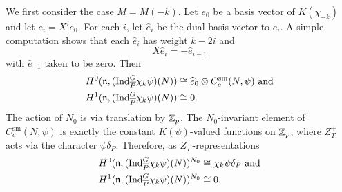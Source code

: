 \documentclass[10pt]{amsart}
\begin{document}
\begin{example}\label{ex:Jacquet_indchi} We first consider the case $M=M(-k)$. Let $e_{0}$ be a basis vector of $K(\chi_{-k})$ and let $e_{i}=X^{i}e_{0}$. For each $i$, let $\widehat{e}_{i}$ be the dual basis vector to $e_{i}$. A simple computation shows that each $\widehat{e}_{i}$ has weight $k-2i$ and \[
    X\widehat{e}_{i} = -\widehat{e}_{i-1}
\] with $\widehat{e}_{-1}$ taken to be zero. Then \begin{align*}
    H^{0}(\mathfrak{n},(\textnormal{Ind}_{\overline{P}}^{G}\chi_{k}\psi)(N)) &\cong \widehat{e}_{0} \otimes C_{c}^{\text{sm}}(N,\psi) \text{ and}\\
    H^{1}(\mathfrak{n},(\textnormal{Ind}_{\overline{P}}^{G}\chi_{k}\psi)(N)) &\cong 0.
\end{align*} The action of $N_{0}$ is via translation by $\mathbb{Z}_{p}$. The $N_{0}$-invariant element of $C_{c}^{\text{sm}}(N,\psi)$ is exactly the constant $K(\psi)$-valued functions on $\mathbb{Z}_{p}$, where $Z_{T}^{+}$ acts via the character $\psi\delta_{P}$. Therefore, as $Z_{T}^{+}$-representations \begin{align*}
    H^{0}(\mathfrak{n},(\textnormal{Ind}_{\overline{P}}^{G}\chi_{k}\psi)(N))^{N_{0}} &\cong \chi_{k}\psi\delta_{P} \textnormal{ and}\\
    H^{1}(\mathfrak{n},(\textnormal{Ind}_{\overline{P}}^{G}\chi_{k}\psi)(N))^{N_{0}} &\cong 0.
\end{align*}


\end{example}
\end{document}
